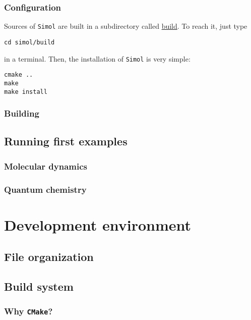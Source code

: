 \documentclass[12pt]{book}
\newcommand{\CMake}{\texttt{CMake}\xspace}
\newcommand{\Simol}{\texttt{Simol}\xspace}
\begin{document}
\subsection{Configuration}

Sources of \Simol are built in a subdirectory called \url{build}. To reach it, just type
\lstset{language=bash} 
\begin{lstlisting}
cd simol/build
\end{lstlisting}
in a terminal. Then, the installation of \Simol is very simple:
\lstset{language=bash} 
\begin{lstlisting}
cmake ..
make
make install
\end{lstlisting}

\subsection{Building}



\section{Running first examples}

\subsection{Molecular dynamics}

\subsection{Quantum chemistry}


\chapter{Development environment}

\section{File organization}
\section{Build system}

\subsection{Why \CMake?}
\end{document}
